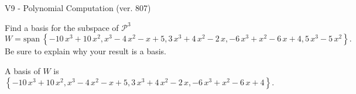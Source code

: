 \begin{exercise}
  \begin{exerciseTitle}V9 - Polynomial Computation (ver. 807)\end{exerciseTitle}
  \begin{exerciseStatement}
    Find a basis for the subspace of \(\mathcal{P}^3\) 
\[W=\mathrm{span}\ \left\{-10 \, x^{3} + 10 \, x^{2} , x^{3} - 4 \, x^{2} - x + 5 , 3 \, x^{3} + 4 \, x^{2} - 2 \, x , -6 \, x^{3} + x^{2} - 6 \, x + 4 , 5 \, x^{3} - 5 \, x^{2}\right\}.\]
 Be sure to explain why your result is a basis.


  \end{exerciseStatement}
  \begin{exerciseAnswer}
   A basis of \(W\) is  \(\left\{-10 \, x^{3} + 10 \, x^{2} , x^{3} - 4 \, x^{2} - x + 5 , 3 \, x^{3} + 4 \, x^{2} - 2 \, x , -6 \, x^{3} + x^{2} - 6 \, x + 4\right\}\).
  


  \end{exerciseAnswer}
\end{exercise}